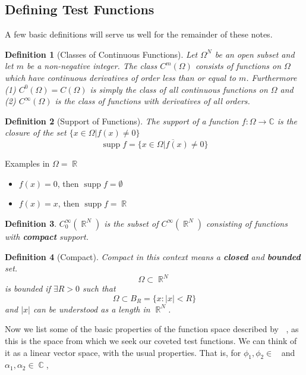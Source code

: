 \documentclass[12pt, a4]{article}
\newtheorem{definition}{Definition}[section]
\DeclareMathOperator\supp{supp}
\DeclareMathOperator\reals{\mathbb{R}}
\DeclareMathOperator\complexes{\mathbb{C}}
\DeclareMathOperator\tfspace{C_0^\infty}
\begin{document}
\subsection{Defining Test Functions}

A few basic definitions will serve us well for the remainder of these notes.

\begin{definition}[Classes of Continuous Functions]
Let $\Omega^N$ be an open subset and let $m$ be a non-negative integer. The class $C^m(\Omega)$ consists of functions on $\Omega$ which have continuous derivatives of order less than or equal to $m$. Furthermore (1) $C^0(\Omega) = C(\Omega)$  is simply the class of all continuous functions on $\Omega$ and (2) $C^\infty (\Omega)$ is the class of functions with derivatives of all orders.
\label{def:c_m_functions}
\end{definition}

\begin{definition}[Support of Functions]
The support of a function $f : \Omega \rightarrow \mathbb{C}$ is the closure of the set $\{x \in \Omega | f(x) \neq 0\}$
\[ \supp f = \overline{\{x \in \Omega | f(x) \neq 0\}}\]
\label{def:support_of_functions}
\end{definition}

Examples in $\Omega = \reals$

\begin{itemize}
    \item $f(x) = 0$, then  $\supp f = \emptyset$
    \item $f(x) = x$, then $\supp f = \reals$
\end{itemize}

\begin{definition}
    $C_0^\infty(\reals^N)$ is the subset of $C^\infty(\reals^N)$ consisting of functions with \textbf{compact} support.
\end{definition}

\begin{definition}[Compact]
    Compact in this context means a \textbf{closed} and \textbf{bounded} set.
    \[ \Omega \subset \reals^N\]
    is bounded if $\exists R > 0$ such that
    \[\Omega \subset B_R = \{ x : |x| < R\}\]
    and $|x|$ can be understood as a length in $\reals^N$.
    \label{def:compact_function}
\end{definition}

Now we list some of the basic properties of the function space described by $\tfspace$, as this is the space from which we seek our coveted test functions. We can think of it as a linear vector space, with the usual properties. That is, for $\phi_1, \phi_2 \in \tfspace$ and $\alpha_1, \alpha_2 \in \complexes$,
\end{document}
